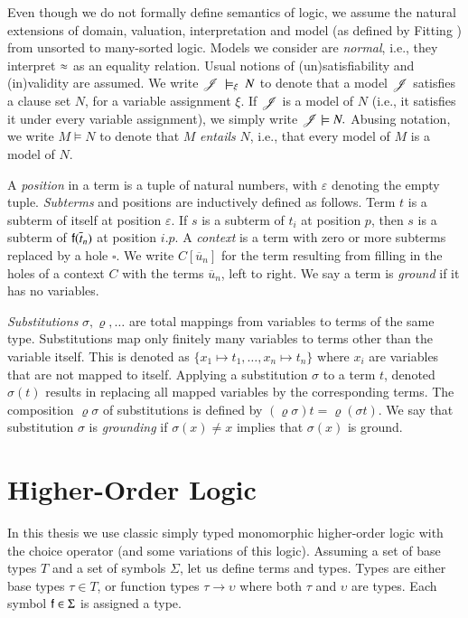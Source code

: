 Even though we do not formally define semantics of logic, we assume the natural
extensions of domain, valuation, interpretation and model (as defined by Fitting
\cite{mf-1996-fol}) from unsorted to many-sorted logic. Models we consider are
\emph{normal}, i.e., they interpret $\approx$ as an equality relation. Usual notions
of (un)satisfiability and (in)validity are assumed. We write
$\mathscr{J}~\models_\xi~N$ to denote that a model $\mathscr{J}$ satisfies a clause
set $N$, for a variable assignment $\xi$. If $\mathscr{J}$ is a model of $N$
(i.e., it satisfies it under every variable assignment), we simply write
$\mathscr{J} \models N.$  Abusing notation, we write $M \models N$ to denote that
$M$ \emph{entails} $N$, i.e., that every model of $M$ is a model of $N.$

A {\em position} in a term is a tuple of natural numbers, with $\varepsilon$ denoting
the empty tuple. {\em Subterms} and positions are inductively defined as follows. Term
$t$ is a subterm of itself at position $\varepsilon$. If $s$ is a subterm of
$t_i$ at position $p$, then $s$ is a subterm of $\mathsf{f}(\overline{t}_{n})$ at
position $i.p$. A {\em context} is a term with zero or more subterms replaced by a
hole $\square$. We write $C[\overline{u}_n]$ for the term resulting from filling
in the holes of a context $C$ with the terms $\overline{u}_n$, left to right.
We say a term is {\em ground} if it has no variables.

{\em Substitutions} $\sigma, \varrho, \ldots$ are total mappings from variables to
terms of the same type. Substitutions map only finitely many variables to terms
other than the variable itself. This is denoted as $\{ x_1 \mapsto t_1, \ldots,
x_n \mapsto t_n \}$ where $x_i$ are variables that are not mapped to itself.
Applying a substitution $\sigma$ to a term $t$, denoted $\sigma(t)$ results in
replacing all mapped variables by the corresponding terms.
The composition $\varrho\sigma$ of substitutions is defined by
$\left(\varrho\sigma\right)t=\varrho\left(\sigma t\right)$. We say that substitution $\sigma$ is {\em grounding}
if $\sigma(x) \not= x$ implies that $\sigma(x)$ is ground.

\section{Higher-Order Logic}
\label{sec:pre:hol}

In this thesis we use classic simply typed monomorphic higher-order logic with
the choice operator (and some variations of this logic). Assuming a set of
base types $T$ and a set of symbols $\Sigma$, let us
define terms and types. Types are either base types $\tau \in T$, or function
types $\tau \rightarrow \upsilon$ where both $\tau$ and $\upsilon$ are types.
Each symbol $\mathsf{f} \in \Sigma$ is assigned a type.

